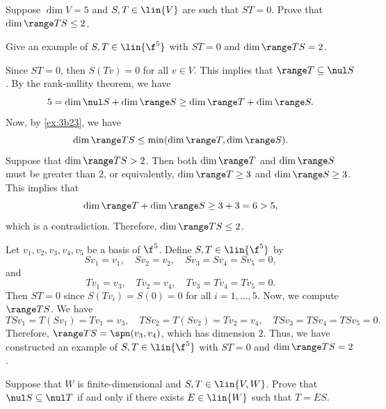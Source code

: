 \begin{exercise}[3b24]
    \begin{subexercises}
        \item Suppose $\dim V = 5$ and $S, T \in \lin{V}$ are such that $ST = 0$. Prove that $\dim \range TS \leq 2$.
        \item Give an example of $S, T \in \lin{\f^5}$ with $ST = 0$ and $\dim \range TS = 2$.
    \end{subexercises}
\end{exercise}

\begin{sole}
    \item Since $ST = 0$, then $S(Tv) = 0$ for all $v \in V$. This implies that $\range T \subseteq \nul S$. By the rank-nullity theorem, we have
    \[5 = \dim \nul S + \dim \range S \geq \dim \range T + \dim \range S.\]
    Now, by \autoref{ex:3b23}, we have
    \[\dim \range TS \leq \min(\dim \range T, \dim \range S).\]
    Suppose that $\dim \range TS > 2$. Then both $\dim \range T$ and $\dim \range S$ must be greater than $2$, or equivalently, $\dim \range T \geq 3$ and $\dim \range S \geq 3$. This implies that
    \[\dim \range T + \dim \range S \geq 3 + 3 = 6 > 5,\]
    which is a contradiction. Therefore, $\dim \range TS \leq 2$.
    \item Let $v_1, v_2, v_3, v_4, v_5$ be a basis of $\f^5$. Define $S, T \in \lin{\f^5}$ by
    \[Sv_1 = v_1, \quad Sv_2 = v_2, \quad Sv_3 = Sv_4 = Sv_5 = 0,\]
    and
    \[Tv_1 = v_3, \quad Tv_2 = v_4, \quad Tv_3 = Tv_4 = Tv_5 = 0.\]
    Then $ST = 0$ since $S(Tv_i) = S(0) = 0$ for all $i = 1, \ldots, 5$. Now, we compute $\range TS$. We have
    \[TSv_1 = T(Sv_1) = Tv_1 = v_3, \quad TSv_2 = T(Sv_2) = Tv_2 = v_4, \quad TSv_3 = TSv_4 = TSv_5 = 0.\]
    Therefore, $\range TS = \spn(v_3, v_4)$, which has dimension $2$. Thus, we have constructed an example of $S, T \in \lin{\f^5}$ with $ST = 0$ and $\dim \range TS = 2$.
\end{sole}

\begin{exercise}[3b25]
    Suppose that $W$ is finite-dimensional and $S, T \in \lin{V, W}$. Prove that $\nul S \subseteq \nul T$ if and only if there exists $E \in \lin{W}$ such that $T = ES$.

\end{exercise}

